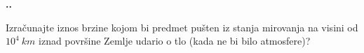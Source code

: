 

\noindent 
\textbf{
\thecjelina.\thezadatak.}

Izračunajte iznos brzine kojom bi predmet pušten iz stanja mirovanja na visini od $10^4\ km$
iznad površine Zemlje udario o tlo (kada ne bi bilo atmosfere)?

